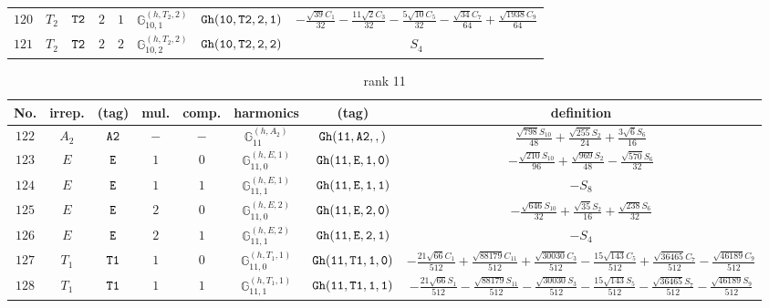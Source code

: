 \documentclass[fleqn,8pt]{jsarticle}
\begin{document}
\begin{table}[ht!]
\begin{center}
\begin{tabular}{cccccccc}
$ 120 $ & $ T_{2} $ & $ {\tt T2} $ & $ 2 $ & $ 1 $ & $ \mathbb{G}_{10,1}^{(h,T_{2},2)} $ & $ {\tt Gh(10,T2,2,1)} $ & $ - \frac{\sqrt{39} C_{1}}{32} - \frac{11 \sqrt{2} C_{3}}{32} - \frac{5 \sqrt{10} C_{5}}{32} - \frac{\sqrt{34} C_{7}}{64} + \frac{\sqrt{1938} C_{9}}{64} $ \\
$ 121 $ & $ T_{2} $ & $ {\tt T2} $ & $ 2 $ & $ 2 $ & $ \mathbb{G}_{10,2}^{(h,T_{2},2)} $ & $ {\tt Gh(10,T2,2,2)} $ & $ S_{4} $ \\
 \hline \hline
\end{tabular}
\end{center}
\end{table}
\begin{table}[ht!]
\begin{center}
\caption{rank 11}
\renewcommand{\arraystretch}{1.3}
\begin{tabular}{cccccccc} \hline \hline
No. & irrep. & (tag) & mul. & comp. & harmonics & (tag) & definition \\ \hline
$ 122 $ & $ A_{2} $ & $ {\tt A2} $ & $ - $ & $ - $ & $ \mathbb{G}_{11}^{(h,A_{2})} $ & $ {\tt Gh(11,A2,,)} $ & $ \frac{\sqrt{798} S_{10}}{48} + \frac{\sqrt{255} S_{2}}{24} + \frac{3 \sqrt{6} S_{6}}{16} $ \\
$ 123 $ & $ E $ & $ {\tt E} $ & $ 1 $ & $ 0 $ & $ \mathbb{G}_{11,0}^{(h,E,1)} $ & $ {\tt Gh(11,E,1,0)} $ & $ - \frac{\sqrt{210} S_{10}}{96} + \frac{\sqrt{969} S_{2}}{48} - \frac{\sqrt{570} S_{6}}{32} $ \\
$ 124 $ & $ E $ & $ {\tt E} $ & $ 1 $ & $ 1 $ & $ \mathbb{G}_{11,1}^{(h,E,1)} $ & $ {\tt Gh(11,E,1,1)} $ & $ - S_{8} $ \\
$ 125 $ & $ E $ & $ {\tt E} $ & $ 2 $ & $ 0 $ & $ \mathbb{G}_{11,0}^{(h,E,2)} $ & $ {\tt Gh(11,E,2,0)} $ & $ - \frac{\sqrt{646} S_{10}}{32} + \frac{\sqrt{35} S_{2}}{16} + \frac{\sqrt{238} S_{6}}{32} $ \\
$ 126 $ & $ E $ & $ {\tt E} $ & $ 2 $ & $ 1 $ & $ \mathbb{G}_{11,1}^{(h,E,2)} $ & $ {\tt Gh(11,E,2,1)} $ & $ - S_{4} $ \\
$ 127 $ & $ T_{1} $ & $ {\tt T1} $ & $ 1 $ & $ 0 $ & $ \mathbb{G}_{11,0}^{(h,T_{1},1)} $ & $ {\tt Gh(11,T1,1,0)} $ & $ - \frac{21 \sqrt{66} C_{1}}{512} + \frac{\sqrt{88179} C_{11}}{512} + \frac{\sqrt{30030} C_{3}}{512} - \frac{15 \sqrt{143} C_{5}}{512} + \frac{\sqrt{36465} C_{7}}{512} - \frac{\sqrt{46189} C_{9}}{512} $ \\
$ 128 $ & $ T_{1} $ & $ {\tt T1} $ & $ 1 $ & $ 1 $ & $ \mathbb{G}_{11,1}^{(h,T_{1},1)} $ & $ {\tt Gh(11,T1,1,1)} $ & $ - \frac{21 \sqrt{66} S_{1}}{512} - \frac{\sqrt{88179} S_{11}}{512} - \frac{\sqrt{30030} S_{3}}{512} - \frac{15 \sqrt{143} S_{5}}{512} - \frac{\sqrt{36465} S_{7}}{512} - \frac{\sqrt{46189} S_{9}}{512} $ \\

\end{tabular}
\end{center}
\end{table}
\end{document}
